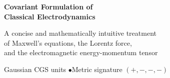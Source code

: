 \documentclass[12pt,a4paper]{book}
\theoremstyle{definition}
\theoremstyle{plain}
\theoremstyle{remark}
\begin{document}
\begin{titlepage}
\centering
\vspace*{3cm}
{\Huge\bfseries Covariant Formulation of\\[0.4em] Classical Electrodynamics\par}
\vspace{2cm}
{\Large A concise and mathematically intuitive treatment\\[0.3em]
of Maxwell's equations, the Lorentz force,\\[0.3em]
and the electromagnetic energy-momentum tensor\par}
\vspace{3cm}
{\large Gaussian CGS units \quad$\bullet$\quad Metric signature $(+,-,-,-)$\par}
\vfill
\end{titlepage}

\frontmatter
\tableofcontents

\mainmatter












\end{document}
